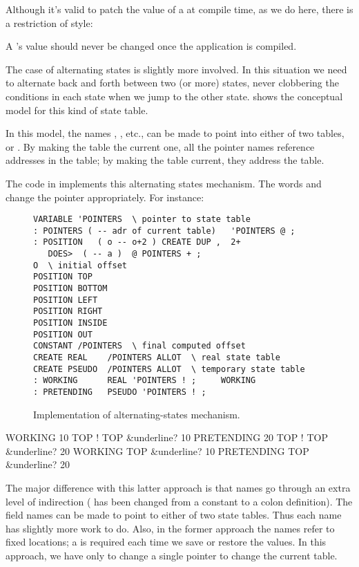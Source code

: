 Although it's valid to patch the value of a  at compile
time, as we do here, there is a restriction of style:

\begin{tip}
A 's value should never be changed once the application is
compiled.
\end{tip}
The case of alternating states is slightly more involved. In this situation
we need to alternate back and forth between two (or more) states, never
clobbering the conditions in each state when we jump to the other state.
 shows the conceptual model for this kind of state table.



In this model, the names , , etc., can be
made to point into either of two tables,  or
. By making the  table the current one, all
the pointer names reference addresses in the  table; by
making the  table current, they address the
 table.

The code in  implements this alternating states mechanism.
The words  and  change the pointer
appropriately. For instance:

\begin{figure*}
\caption{Implementation of alternating-states mechanism.}
\begin{center}
\begin{BVerbatim}
VARIABLE 'POINTERS  \ pointer to state table
: POINTERS ( -- adr of current table)   'POINTERS @ ;
: POSITION   ( o -- o+2 ) CREATE DUP ,  2+
   DOES>  ( -- a )  @ POINTERS + ;
O  \ initial offset
POSITION TOP
POSITION BOTTOM
POSITION LEFT
POSITION RIGHT
POSITION INSIDE
POSITION OUT
CONSTANT /POINTERS  \ final computed offset
CREATE REAL    /POINTERS ALLOT  \ real state table
CREATE PSEUDO  /POINTERS ALLOT  \ temporary state table
: WORKING      REAL 'POINTERS ! ;     WORKING
: PRETENDING   PSEUDO 'POINTERS ! ;
\end{BVerbatim}
\end{center}
\end{figure*}

\begin{Code}[commandchars=&\{\}]
WORKING
10 TOP !
TOP &underline{? 10}
PRETENDING
20 TOP !
TOP &underline{? 20}
WORKING
TOP &underline{? 10}
PRETENDING
TOP &underline{? 20}
\end{Code}
The major difference with this latter approach is that names go through
an extra level of indirection ( has been changed from a
constant to a colon definition). The field names can be made to point to
either of two state tables. Thus each name has slightly more work to do.
Also, in the former approach the names refer to fixed locations; a
 is required each time we save or restore the values. In this
approach, we have only to change a single pointer to change the current
table.


